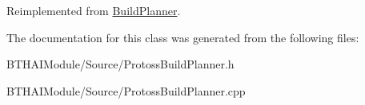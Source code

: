 Reimplemented from \hyperlink{class_build_planner_a06b0db27196c7e1ecc0181f2d3865a88}{BuildPlanner}.



The documentation for this class was generated from the following files:\begin{DoxyCompactItemize}
\item 
BTHAIModule/Source/ProtossBuildPlanner.h\item 
BTHAIModule/Source/ProtossBuildPlanner.cpp\end{DoxyCompactItemize}
